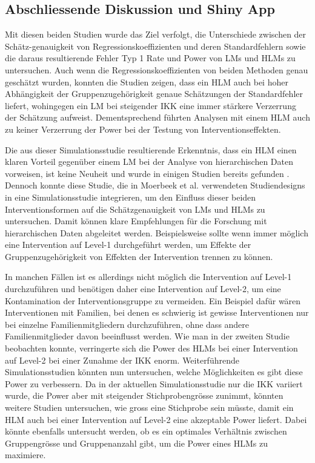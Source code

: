 \documentclass[12pt]{article}\usepackage[]{graphicx}\usepackage[]{color}
\begin{document}
\subsection{Abschliessende Diskussion und Shiny App}
Mit diesen beiden Studien wurde das Ziel verfolgt, die Unterschiede zwischen der Schätz-genauigkeit von Regressionskoeffizienten und deren Standardfehlern sowie die daraus resultierende Fehler Typ 1 Rate und Power von LMs und HLMs zu untersuchen. Auch wenn die Regressionskoeffizienten von beiden Methoden genau geschätzt wurden, konnten die Studien zeigen, dass ein HLM auch bei hoher Abhängigkeit der Gruppenzugehörigkeit genaue Schätzungen der Standardfehler liefert, wohingegen ein LM bei steigender IKK eine immer stärkere Verzerrung der Schätzung aufweist. Dementsprechend führten Analysen mit einem HLM auch zu keiner Verzerrung der Power bei der Testung von Interventionseffekten.

Die aus dieser Simulationsstudie resultierende Erkenntnis, dass ein HLM einen klaren Vorteil gegenüber einem LM bei der Analyse von hierarchischen Daten vorweisen, ist keine Neuheit und wurde in einigen Studien bereits gefunden \citep{mcneish2014analyzing, MOERBEEK2003341, mundfrom2002monte, osborne2000advantages}. Dennoch konnte diese Studie, die in Moerbeek et al. \citeyearpar{MOERBEEK2003341} verwendeten Studiendesigns in eine Simulationsstudie integrieren, um den Einfluss dieser beiden Interventionsformen auf die Schätzgenauigkeit von LMs und HLMs zu untersuchen. Damit können klare Empfehlungen für die Forschung mit hierarchischen Daten abgeleitet werden. Beispielsweise sollte wenn immer möglich eine Intervention auf Level-1 durchgeführt werden, um Effekte der Gruppenzugehörigkeit von Effekten der Intervention trennen zu können. 

In manchen Fällen ist es allerdings nicht möglich die Intervention auf Level-1 durchzuführen und benötigen daher eine Intervention auf Level-2, um eine Kontamination der Interventionsgruppe zu vermeiden. Ein Beispiel dafür wären Interventionen mit Familien, bei denen es schwierig ist gewisse Interventionen nur bei einzelne Familienmitgliedern durchzuführen, ohne dass andere Familienmitglieder davon beeinflusst werden. Wie man in der zweiten Studie beobachten konnte, verringerte sich die Power des HLMs bei einer Intervention auf Level-2 bei einer Zunahme der IKK enorm. Weiterführende Simulationsstudien könnten nun untersuchen, welche Möglichkeiten es gibt diese Power zu verbessern. Da in der aktuellen Simulationsstudie nur die IKK variiert wurde, die Power aber mit steigender Stichprobengrösse zunimmt, könnten weitere Studien untersuchen, wie gross eine Stichprobe sein müsste, damit ein HLM auch bei einer Intervention auf Level-2 eine akzeptable Power liefert. Dabei könnte ebenfalls untersucht werden, ob es ein optimales Verhältnis zwischen Gruppengrösse und Gruppenanzahl gibt, um die Power eines HLMs zu maximiere.
\end{document}
